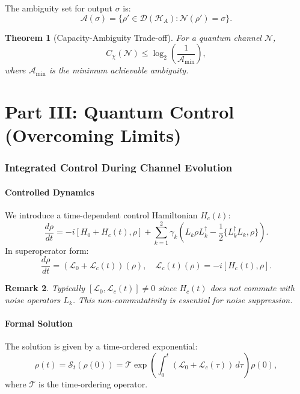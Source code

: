 \documentclass[12pt]{article}
\newtheorem{theorem}{Theorem}[section]
\newtheorem{remark}[theorem]{Remark}
\newcommand{\SJ}{\mathcal{S}}
\newcommand{\Lgen}{\mathcal{L}}
\newcommand{\T}{\mathcal{T}}
\begin{document}
The ambiguity set for output $\sigma$ is:
\begin{equation}
    \mathcal{A}(\sigma) = \{ \rho' \in \mathcal{D}(\mathcal{H}_A) : \mathcal{N}(\rho') = \sigma \}.
\end{equation}

\begin{theorem}[Capacity-Ambiguity Trade-off]
    For a quantum channel $\mathcal{N}$,
    \begin{equation}
        C_\chi(\mathcal{N}) \leq \log_2 \left( \frac{1}{\mathcal{A}_{\min}} \right),
    \end{equation}
    where $\mathcal{A}_{\min}$ is the minimum achievable ambiguity.
\end{theorem}

\part*{Part III: Quantum Control (Overcoming Limits)}

\section{Integrated Control During Channel Evolution}
\subsection{Controlled Dynamics}
We introduce a time-dependent control Hamiltonian $H_c(t)$:
\begin{equation}
    \frac{d\rho}{dt} = -i[H_0 + H_c(t), \rho] + \sum_{k=1}^2 \gamma_k \left( L_k \rho L_k^\dagger - \frac{1}{2} \{ L_k^\dagger L_k, \rho \} \right).
\end{equation}
In superoperator form:
\begin{equation}
    \frac{d\rho}{dt} = (\Lgen_0 + \Lgen_c(t))(\rho), \quad \Lgen_c(t)(\rho) = -i[H_c(t), \rho].
\end{equation}
\begin{remark}
    Typically $[\Lgen_0, \Lgen_c(t)] \neq 0$ since $H_c(t)$ does not commute with noise operators $L_k$. This non-commutativity is essential for noise suppression.
\end{remark}

\subsection{Formal Solution}
The solution is given by a time-ordered exponential:
\begin{equation}
    \rho(t) = \SJ_t(\rho(0)) = \T \exp\left( \int_0^t (\Lgen_0 + \Lgen_c(\tau)) \, d\tau \right) \rho(0),
\end{equation}
where $\T$ is the time-ordering operator.
\end{document}
